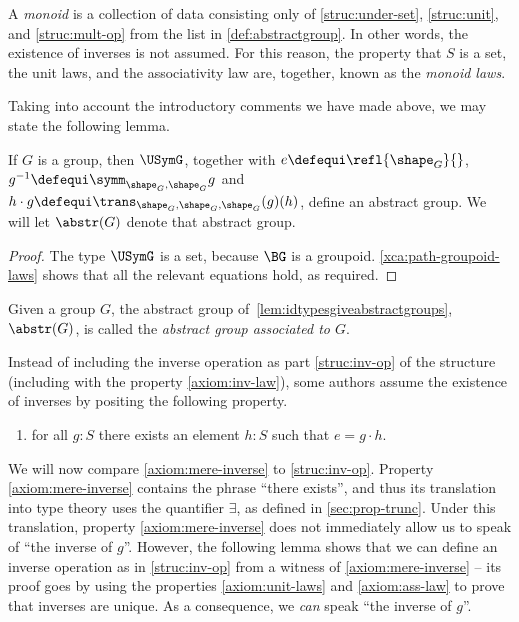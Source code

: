 \begin{remark}
  A \emph{monoid} is a collection of data consisting only of \ref{struc:under-set}, \ref{struc:unit}, and \ref{struc:mult-op} from the list in
  \cref{def:abstractgroup}.  In other words, the existence of inverses is not assumed.  For this reason, the property that $S$ is a set, the
  unit laws, and the associativity law are, together, known as the \emph{monoid laws}.
\end{remark}

Taking into account the introductory comments we have made above, we may state the following lemma.

\begin{lemma}\label{lem:idtypesgiveabstractgroups}
  If $G$ is a group, then $\USymG$,
  together with $e\defequi\refl{\shape_G}{}$,
  $g^{-1}\defequi\symm_{\shape_G,\shape_G}g$
  and $h \cdot g \defequi \trans_{\shape_G,\shape_G,\shape_G}(g)(h)$, define an abstract group.
  We will let $\abstr(G)$ denote that abstract group.
\end{lemma}

\begin{proof}
  The type $\USymG$ is a set, because $\BG$ is a groupoid.
  \cref{xca:path-groupoid-laws} shows that all the relevant equations hold, as required.
\end{proof}

\begin{definition}\label{def:abstrG}
  Given a group $G$, the abstract group of~\cref{lem:idtypesgiveabstractgroups},
  $\abstr(G)$, is called the \emph{abstract group associated to $G$}.
\end{definition}

\begin{remark}\label{rem:inverses-as-property}
  Instead of including the inverse operation as part
  \ref{struc:inv-op} of the structure (including with the property
  \ref{axiom:inv-law}), some authors assume the existence of inverses
  by positing the following property.
  \begin{enumerate}[resume*]
    \item\label{axiom:mere-inverse} for all $g:S$ there exists an element
    $h:S$ such that $e = g \cdot h$.
  \end{enumerate}

  We will now compare \ref{axiom:mere-inverse} to \ref{struc:inv-op}.
  Property \ref{axiom:mere-inverse} contains the phrase ``there exists'', and thus its translation into type theory
  uses the quantifier $\exists$, as defined in \cref{sec:prop-trunc}.  Under this translation, property \ref{axiom:mere-inverse} does
  not immediately allow us to speak of ``the inverse of $g$''.
  However, the following lemma shows that we can define an inverse operation as in \ref{struc:inv-op} from a witness of \ref{axiom:mere-inverse}
  -- its proof goes by using the properties \ref{axiom:unit-laws} and \ref{axiom:ass-law} to prove that inverses are unique.  As a consequence,
  we \emph{can} speak ``the inverse of $g$''.
\end{remark}

